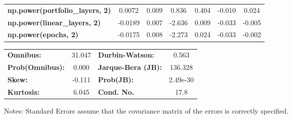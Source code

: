 \begin{center}
\begin{tabular}{lcccccc}
\textbf{np.power(portfolio\_layers, 2)}    &       0.0072  &        0.009     &     0.836  &         0.404        &       -0.010    &        0.024     \\
\textbf{np.power(linear\_layers, 2)}       &      -0.0189  &        0.007     &    -2.636  &         0.009        &       -0.033    &       -0.005     \\
\textbf{np.power(epochs, 2)}               &      -0.0175  &        0.008     &    -2.273  &         0.024        &       -0.033    &       -0.002     \\
\bottomrule
\end{tabular}
\begin{tabular}{lclc}
\textbf{Omnibus:}       & 31.047 & \textbf{  Durbin-Watson:     } &    0.563  \\
\textbf{Prob(Omnibus):} &  0.000 & \textbf{  Jarque-Bera (JB):  } &  136.328  \\
\textbf{Skew:}          & -0.111 & \textbf{  Prob(JB):          } & 2.49e-30  \\
\textbf{Kurtosis:}      &  6.045 & \textbf{  Cond. No.          } &     17.8  \\
\bottomrule
\end{tabular}
\end{center}

Notes: \newline
 [1] Standard Errors assume that the covariance matrix of the errors is correctly specified.
